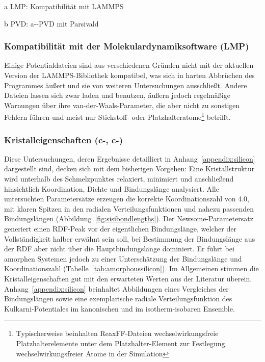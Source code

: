 \begin{table}
\begin{threeparttable}

    \begin{tablenotes}[para]
      \item[a] LMP: Kompatibilität mit LAMMPS
      \item[b] PVD: a--PVD mit Parsivald
    \end{tablenotes}
  \end{threeparttable}
\end{table}

\subsubsection{Kompatibilität mit der Molekulardynamiksoftware (LMP)}

Einige Potentialdateien sind aus verschiedenen Gründen nicht mit der aktuellen Version der LAMMPS-Bibliothek kompatibel, was sich in harten Abbrüchen des Programmes äußert und sie von weiteren Untersuchungen ausschließt.
Andere Dateien lassen sich zwar laden und benutzen, äußern jedoch regelmäßige Warnungen über ihre van-der-Waals-Parameter, die aber nicht zu sonstigen Fehlern führen und meist nur Stickstoff- oder Platzhalteratome\footnote{Typischerweise beinhalten ReaxFF-Dateien wechselwirkungsfreie Platzhalterelemente unter dem Platzhalter-Element  zur Festlegung wechselwirkungsfreier Atome in der Simulation} betrifft.

\subsubsection{Kristalleigenschaften (c-, c-)}

Diese Untersuchungen, deren Ergebnisse detailliert in Anhang~\ref{appendix:silicon} dargestellt sind, decken sich mit dem bisherigen Vorgehen:
Eine Kristallstruktur wird unterhalb des Schmelzpunktes relaxiert, minimiert und anschließend hinsichtlich Koordination, Dichte und Bindungslänge analysiert.
Alle untersuchten Parametersätze erzeugen die korrekte Koordinationszahl von 4.0, mit klaren Spitzen in den radialen Verteilungsfunktionen und nahezu passenden Bindungslängen (Abbildung~\ref{fig:sisibondlengths}).
Der Newsome-Parametersatz generiert einen RDF-Peak vor der eigentlichen Bindungslänge, welcher der Vollständigkeit halber erwähnt sein soll, bei Bestimmung der Bindungslänge aus der RDF aber nicht über die Hauptbindungslänge dominiert.
Er führt bei amorphen Systemen jedoch zu einer Unterschätzung der Bindungslänge und Koordinationszahl (Tabelle~\ref{tab:amorphoussilicon}).
Im Allgemeinen stimmen die Kristalleigenschaften gut mit den erwarteten Werten aus der Literatur überein.
Anhang~\ref{appendix:silicon} beinhaltet Abbildungen eines Vergleiches der Bindungslängen sowie eine exemplarische radiale Verteilungsfunktion des Kulkarni-Potentiales im kanonischen und im isotherm-isobaren Ensemble.

